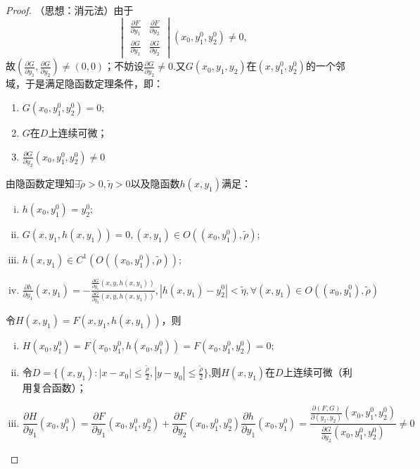 \documentclass[UTF8]{ctexart}
\begin{document}
        \begin{proof}
            （思想：消元法）由于$$\begin{vmatrix}
                \frac{\partial F}{\partial y_1} & \frac{\partial F}{\partial y_2}\\
                \frac{\partial G}{\partial y_1} & \frac{\partial G}{\partial y_2}
            \end{vmatrix}(x_0,y_1^0,y_2^0)\not=0,$$
            故$(\frac{\partial G}{\partial y_1},\frac{\partial G}{\partial y_2})\not=(0,0)$；不妨设$\frac{\partial G}{\partial y_2}\not=0$.又$G(x_0,y_1,y_2)$在$(x,y_1^0,y_2^0)$的一个邻域，于是满足隐函数定理条件，即：
            \begin{enumerate}[(1)]
                \item $G(x_0,y_1^0,y_2^0)=0$;
                \item $G$在$D$上连续可微；
                \item $\frac{\partial G}{\partial y_2}(x_0,y_1^0,y_2^0)\not=0$
            \end{enumerate}
            由隐函数定理知$\exists\tilde{\rho}>0,\tilde{\eta}>0$以及隐函数$h(x,y_1)$满足：
            \begin{enumerate}[(i)]
                \item $h(x_0,y_1^0)=y_2^0$;
                \item $G(x,y_1,h(x,y_1))=0,(x,y_1)\in O((x_0,y_1^0),\tilde{\rho})$;
                \item $h(x,y_1)\in C^1(O((x_0,y_1^0),\tilde{\rho}))$;
                \item $\frac{\partial h}{\partial y_1}(x,y_1)=-\frac{\frac{\partial G}{\partial y_1}(x,y,h(x,y_1))}{\frac{\partial G}{\partial y_2}(x,y,h(x,y_1))},|h(x,y_1)-y_2^0|<\tilde{\eta},\forall (x,y_1)\in O((x_0,y_1^0),\tilde{\rho})$
            \end{enumerate}
            令$H(x,y_1)=F(x,y_1,h(x,y_1))$，则
            \begin{enumerate}[(i)]
                \item $H(x_0,y_1^0)=F(x_0,y_1^0,h(x_0,y_1^0))=F(x_0,y_1^0,y_2^0)=0$;
                \item 令$D=\{(x,y_1):|x-x_0|\le\frac{\tilde{\rho}}{2},|y-y_0|\le\frac{\tilde{\rho}}{2}\}$,则$H(x,y_1)$在$D$上连续可微（利用复合函数）；
                \item $$\frac{\partial H}{\partial y_1}(x_0,y_1^0)=\frac{\partial F}{\partial y_1}(x_0,y_1^0,y_2^0)+\frac{\partial F}{\partial y_2}(x_0,y_1^0,y_2^0)\frac{\partial h}{\partial y_1}(x_0,y_1^0)=\frac{\frac{\partial(F,G)}{\partial(y_1,y_2)}(x_0,y_1^0,y_2^0)}{\frac{\partial G}{\partial y_2}(x_0,y_1^0,y_2^0)}\not=0$$

\end{enumerate}
\end{proof}
\end{document}
